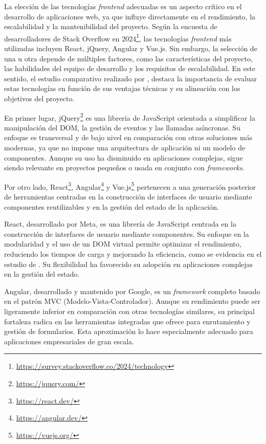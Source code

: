 La elección de las tecnologías \textit{frontend} adecuadas es un aspecto crítico en el desarrollo de aplicaciones web, ya que influye directamente en el rendimiento, la escalabilidad y la mantenibilidad del proyecto. Según la encuesta de desarrolladores de Stack Overflow en 2024\footnote{\url{https://survey.stackoverflow.co/2024/technology}}, las tecnologías \textit{frontend} más utilizadas incluyen React, jQuery, Angular y Vue.js. Sin embargo, la selección de una u otra depende de múltiples factores, como las características del proyecto, las habilidades del equipo de desarrollo y los requisitos de escalabilidad. En este sentido, el estudio comparativo realizado por \cite{Sekhar_Emmanni_2023}, destaca la importancia de evaluar estas tecnologías en función de sus ventajas técnicas y su alineación con los objetivos del proyecto. 

En primer lugar, jQuery\footnote{\url{https://jquery.com/}} es una librería de JavaScript orientada a simplificar la manipulación del DOM, la gestión de eventos y las llamadas asíncronas. Su enfoque es transversal y de bajo nivel en comparación con otras soluciones más modernas, ya que no impone una arquitectura de aplicación ni un modelo de componentes. Aunque su uso ha disminuido en aplicaciones complejas, sigue siendo relevante en proyectos pequeños o usada en conjunto con \textit{frameworks}.

Por otro lado, React\footnote{\url{https://react.dev/}}, Angular\footnote{\url{https://angular.dev/}} y Vue.js\footnote{\url{https://vuejs.org/}} pertenecen a una generación posterior de herramientas centradas en la construcción de interfaces de usuario mediante componentes reutilizables y en la gestión del estado de la aplicación.

React, desarrollado por Meta, es una librería de JavaScript centrada en la construcción de interfaces de usuario mediante componentes. Su enfoque en la modularidad y el uso de un DOM virtual permite optimizar el rendimiento, reduciendo los tiempos de carga y mejorando la eficiencia, como se evidencia en el estudio de \cite{Sekhar_Emmanni_2023}. Su flexibilidad ha favorecido su adopción en aplicaciones complejas en la gestión del estado.

Angular, desarrollado y mantenido por Google, es un \textit{framework} completo basado en el patrón MVC (Modelo-Vista-Controlador). Aunque su rendimiento puede ser ligeramente inferior en comparación con otras tecnologías similares, su principal fortaleza radica en las herramientas integradas que ofrece para enrutamiento y gestión de formularios. Esta aproximación lo hace especialmente adecuado para aplicaciones empresariales de gran escala. 

